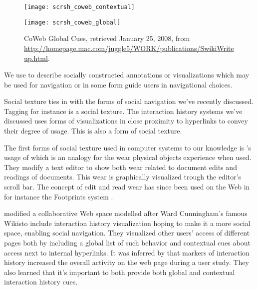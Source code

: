 \begin{figure}
  \captionstyle{\raggedright}
  \begin{whole}
    \begin{minipage}[t]{0.475\wholewidth}
      \texttt{[image: scrsh\_coweb\_contextual]}
      \caption[CoWeb Contextual Cues]{%
        CoWeb Contextual Cues,
        retrieved January 25, 2008, from
        \url{http://homepage.mac.com/juggle5/WORK/publications/SwikiWriteup.html}.
      }
      \label{figure:scrsh.coweb.contextual}
    \end{minipage}
    \hfill
    \begin{minipage}[t]{0.475\wholewidth}
      \texttt{[image: scrsh\_coweb\_global]}
      \caption[CoWeb Global Cues]{%
        CoWeb Global Cues,
        retrieved January 25, 2008, from
        \url{http://homepage.mac.com/juggle5/WORK/publications/SwikiWriteup.html}.
      }
      \label{figure:scrsh.coweb.global}
    \end{minipage}
  \end{whole}
  \normalcaption
\end{figure}

We use  to describe socially constructed annotations or
visualizations which may be used for navigation or in some form guide
users in navigational choices.

Social texture ties in with the forms of social navigation we've
recently discussed. Tagging for instance is a social texture.
The interaction history systems we've discussed uses forms of visualizations
in close proximity to hyperlinks to convey their degree of usage. This is also
a form of social texture.

The first forms of social texture used in computer systems to our knowledge is
\citet{hill92}'s usage of  which is an analogy for
the wear physical objects experience when used. They modify a text editor to
show both wear related to document edits and readings of documents. This wear
is graphically visualized trough the editor's scroll bar.
The concept of edit and read wear has since been used on the Web in for
instance the Footprints system \citep{wexelblat99}.

\citet{dieberger00a} modified \dash{}a collaborative Web space
modelled after Ward Cunningham's famous Wikis\dash{}to include interaction
history visualization hoping to make it a more social space, enabling social
navigation. They visualized other users' access of different pages both by
including a global list of such behavior and contextual cues about access
next to internal hyperlinks.
It was inferred by \citeauthor{dieberger00a} that markers of interaction
history increased the overall activity on the web page during a user study.
They also learned that it's important to both provide both global and
contextual interaction history cues.

